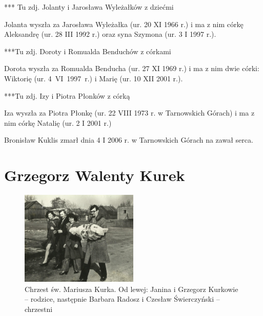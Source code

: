 {\color{red}
*** Tu zdj. Jolanty i Jarosława Wyleżałków z dziećmi}


Jolanta wyszła za Jarosława Wyleżałka (ur. 20 XI 1966 r.) i ma z nim córkę Aleksandrę (ur. 28 III 1992 r.) oraz syna Szymona (ur. 3 I 1997 r.).

{\color{red}
***Tu zdj. Doroty i Romualda Benduchów z córkami}

Dorota wyszła za Romualda Benducha (ur. 27 XI 1969 r.) i ma z nim dwie córki: Wiktorię (ur. 4~VI~1997~r.) i Marię (ur. 10 XII 2001 r.).

{\color{red}
***Tu zdj. Izy i Piotra Płonków z córką}

Iza wyszła za Piotra Płonkę (ur. 22 VIII 1973 r. w Tarnowskich Górach) i ma z nim córkę Natalię (ur. 2 I 2001 r.)

Bronisław Kuklis zmarł dnia 4 I 2006 r. w Tarnowskich Górach na zawał serca.




\section{Grzegorz Walenty Kurek}

\begin{figure}[!hb]
\begin{center}
\includegraphics[width=0.5\textwidth]{zdjecia/chrzest_mariusza_kurka.jpg}
\caption[Chrzest św. Mariusza Kurka]{Chrzest św. Mariusza Kurka. Od lewej: Janina i Grzegorz Kurkowie -- rodzice, następnie Barbara Radosz i Czesław Świerczyński -- chrzestni}
\label{rys:chrzest_mariusza_kurka}
\end{center}
\end{figure}

